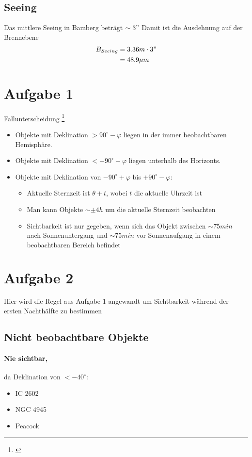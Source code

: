\documentclass[titlepage]{scrartcl}
\begin{document}
\subsection{Seeing}
Das mittlere Seeing in Bamberg beträgt $\sim3 "$ 
Damit ist die Ausdehnung auf der Brennebene
\begin{align*}
B_{Seeing}&=3.36m \cdot 3"\\
&= 48.9 \mu m
\end{align*}
\section{Aufgabe 1}
\label{aufgabe-1}
Fallunterscheidung \footnote{\cite{kmann}}
\begin{itemize}
\item Objekte mit Deklination  $> 90^\circ - \varphi$ liegen in der immer beobachtbaren Hemisphäre.
\item Objekte mit Deklination $< - 90^\circ + \varphi$ liegen unterhalb des Horizonts.
\item Objekte mit Deklination von $-90^\circ + \varphi$ bis $+90^\circ - \varphi$:
\begin{itemize}
\item Aktuelle Sternzeit ist $\theta + t$, wobei $t$ die aktuelle Uhrzeit ist
\item Man kann Objekte $\sim\pm 4 h$ um die aktuelle Sternzeit beobachten
\item Sichtbarkeit ist nur gegeben, wenn sich das Objekt zwischen $\sim 75 min$ nach Sonnenuntergang und $\sim 75 min$ vor Sonnenaufgang in einem beobachtbaren Bereich befindet
\end{itemize}
\end{itemize}
\section{Aufgabe 2}
Hier wird die Regel aus Aufgabe 1 angewandt um Sichtbarkeit während der ersten Nachthälfte zu bestimmen
\subsection{Nicht beobachtbare Objekte}
\paragraph{Nie sichtbar,} da Deklination von $<-40^\circ$:
\begin{itemize}
\item IC 2602
\item NGC 4945
\item Peacock
\end{itemize}
\end{document}
